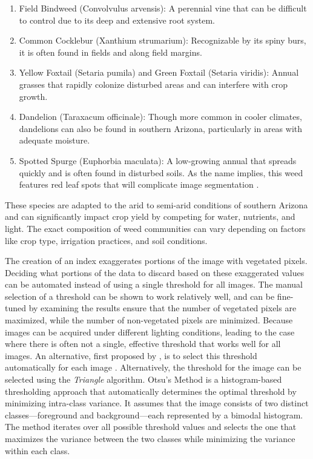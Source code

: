 \documentclass[letterpaper]{report}
\begin{document}
{\begin{enumerate}
	\item{Field Bindweed (Convolvulus arvensis): A perennial vine that can be difficult to control due to its deep and extensive root system.}

	\item{Common Cocklebur (Xanthium strumarium): Recognizable by its spiny burs, it is often found in fields and along field margins.}

	\item{Yellow Foxtail (Setaria pumila) and Green Foxtail (Setaria viridis): Annual grasses that rapidly colonize disturbed areas and can interfere with crop growth.}

	\item{Dandelion (Taraxacum officinale): Though more common in cooler climates, dandelions can also be found in southern Arizona, particularly in areas with adequate moisture.}

	\item{Spotted Spurge (Euphorbia maculata): A low-growing annual that spreads quickly and is often found in disturbed soils. As the name implies, this weed features red leaf spots that will complicate image segmentation \parencite{UC-Davis2009-qy}.}
\end{enumerate}

These species are adapted to the arid to semi-arid conditions of southern Arizona and can significantly impact crop yield by competing for water, nutrients, and light. The exact composition of weed communities can vary depending on factors like crop type, irrigation practices, and soil conditions.

The creation of an index exaggerates portions of the image with vegetated pixels. Deciding what portions of the data to discard based on these exaggerated values can be automated instead of using a single threshold for all images. The manual selection of a threshold can be shown to work relatively well, and can be fine-tuned by examining the results ensure that the number of vegetated pixels are maximized, while the number of non-vegetated pixels are minimized. Because images can be acquired under different lighting conditions, leading to the case where there is often not a single, effective threshold that works well for all images. An alternative, first proposed by \citeauthor{Otsu1979-io}, is to select this threshold automatically for each image \cite{Otsu1979-io}. Alternatively, the threshold for the image can be selected using the \textit{Triangle} algorithm.
Otsu’s Method is a histogram-based thresholding approach that automatically determines the optimal threshold by minimizing intra-class variance. It assumes that the image consists of two distinct classes—foreground and background—each represented by a bimodal histogram. The method iterates over all possible threshold values and selects the one that maximizes the variance between the two classes while minimizing the variance within each class.

}
\end{document}

